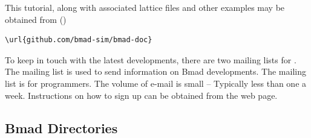 \documentclass{hitec}     %
\begin{document}
This tutorial, along with associated lattice files and other examples may be obtained from 
()
\begin{lstlisting}[mathescape]
  \url{github.com/bmad-sim/bmad-doc}
\end{lstlisting}

To keep in touch with the latest \bmad developments, there are two mailing lists for
\bmad.  The  mailing list is used to send information on Bmad developments.  The
 mailing list is for programmers. The volume of e-mail is small -- Typically
less than one a week. Instructions on how to sign up can be obtained from the \bmad web
page.

\subsection{Bmad Directories}
\label{s:bmad.dir}
\end{document}

